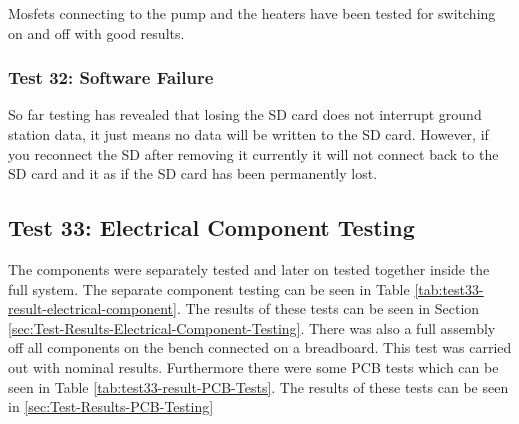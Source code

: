 \documentclass[a4paper,12pt,oneside]{article}
\begin{document}
\begin{appendices}
Mosfets connecting to the pump and the heaters have been tested for switching on and off with good results.

\subsubsection{Test 32: Software Failure}

So far testing has revealed that losing the SD card does not interrupt ground station data, it just means no data will be written to the SD card. However, if you reconnect the SD after removing it currently it will not connect back to the SD card and it as if the SD card has been permanently lost.

\pagebreak
\subsection{Test 33: Electrical Component Testing}
\label{sec:test33result}
The components were separately tested and later on tested together inside the full system. The separate component testing can be seen in Table \ref{tab:test33-result-electrical-component}. The results of these tests can be seen in Section \ref{sec:Test-Results-Electrical-Component-Testing}. There was also a full assembly off all components on the bench connected on a breadboard. This test was carried out with nominal results. Furthermore there were some PCB tests which can be seen in Table \ref{tab:test33-result-PCB-Tests}. The results of these tests can be seen in \ref{sec:Test-Results-PCB-Testing}


\end{appendices}
\end{document}
